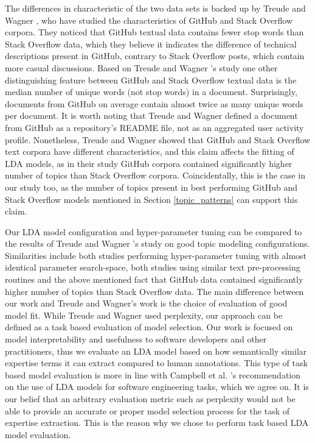         The differences in characteristic of the two data sets is backed up by Treude and Wagner \cite{treude2019predicting}, who have studied the characteristics of GitHub and Stack Overflow corpora. They noticed that GitHub textual data contains fewer stop words than Stack Overflow data, which they believe it indicates the difference of technical descriptions present in GitHub, contrary to Stack Overflow posts, which contain more casual discussions. Based on Treude and Wagner \cite{treude2019predicting}'s study one other distinguishing feature between GitHub and Stack Overflow textual data is the median number of unique words (not stop words) in a document. Surprisingly, documents from GitHub on average contain almost twice as many unique words per document. It is worth noting that Treude and Wagner defined a document from GitHub as a repository's README file, not as an aggregated user activity profile. Nonetheless, Treude and Wagner showed that GitHub and Stack Overflow text corpora have different characteristics, and this claim affects the fitting of LDA models, as in their study GitHub corpora contained significantly higher number of topics than Stack Overflow corpora. Coincidentally, this is the case in our study too, as the number of topics present in best performing GitHub and Stack Overflow models mentioned in Section \ref{topic_patterns} can support this claim.
    
        Our LDA model configuration and hyper-parameter tuning can be compared to the results of Treude and Wagner \cite{treude2019predicting}'s study on good topic modeling configurations. Similarities include both studies performing hyper-parameter tuning with almost identical parameter search-space, both studies using similar text pre-processing routines and the above mentioned fact that GitHub data contained significantly higher number of topics than Stack Overflow data. The main difference between our work and Treude and Wagner's work is the choice of evaluation of good model fit. While Treude and Wagner used perplexity, our approach can be defined as a task based evaluation of model selection. Our work is focused on model interpretability and usefulness to software developers and other practitioners, thus we evaluate an LDA model based on how semantically similar expertise terms it can extract compared to human annotations. This type of task based model evaluation is more in line with Campbell et al. \cite{campbell2015latent}'s recommendation on the use of LDA models for software engineering tasks, which we agree on. It is our belief that an arbitrary evaluation metric such as perplexity would not be able to provide an accurate or proper model selection process for the task of expertise extraction. This is the reason why we chose to perform task based LDA model evaluation.

